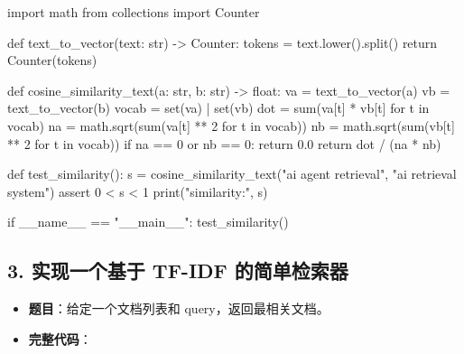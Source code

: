\begin{codeblock}
import math
from collections import Counter


def text_to_vector(text: str) -> Counter:
    tokens = text.lower().split()
    return Counter(tokens)


def cosine_similarity_text(a: str, b: str) -> float:
    va = text_to_vector(a)
    vb = text_to_vector(b)
    vocab = set(va) | set(vb)
    dot = sum(va[t] * vb[t] for t in vocab)
    na = math.sqrt(sum(va[t] ** 2 for t in vocab))
    nb = math.sqrt(sum(vb[t] ** 2 for t in vocab))
    if na == 0 or nb == 0:
        return 0.0
    return dot / (na * nb)


def test_similarity():
    s = cosine_similarity_text("ai agent retrieval", "ai retrieval system")
    assert 0 < s < 1
    print("similarity:", s)


if __name__ == "__main__":
    test_similarity()
\end{codeblock}

\subsection{3. 实现一个基于 TF-IDF 的简单检索器}
\begin{itemize}[leftmargin=2em]
\item \textbf{题目}：给定一个文档列表和 query，返回最相关文档。
\item \textbf{完整代码}：
\end{itemize}

